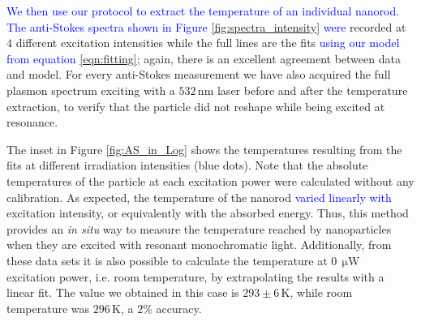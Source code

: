 \documentclass[journal=nalefd,manuscript=letter]{achemso}
\newcommand{\HI}[1]{\textcolor{blue}{#1}} %
\newcommand{\K}{\ensuremath{\,\textrm{K}}}
\newcommand{\nm}{\ensuremath{\,\textrm{nm}}}
\newcommand{\uW}{\ensuremath{\,\upmu\textrm{W}}}
\begin{document}
\HI{We then use our protocol to extract the temperature of an individual nanorod. 
The anti-Stokes spectra shown in Figure \ref{fig:spectra_intensity} were}
recorded at $4$ different excitation intensities while the full lines are the
fits \HI{using our model from equation \ref{eqn:fitting}}; 
again, there is an excellent agreement between data and model. For every
anti-Stokes measurement we have also acquired the full plasmon spectrum 
exciting with a $532\nm$ laser before and after the temperature extraction,
to verify that the particle did not reshape while being excited at resonance. 

The inset in Figure \ref{fig:AS_in_Log} shows the temperatures resulting from
the fits at different irradiation intensities (blue dots). Note
that the absolute temperatures of the particle at each excitation power were
calculated without any calibration. As expected, the temperature of the nanorod
\HI{varied linearly with} excitation intensity, or equivalently with the absorbed
energy. Thus, this method provides an \textit{in situ} way to measure the
temperature reached by nanoparticles when they are excited with resonant
monochromatic light. Additionally, from these data sets it  is also possible to
calculate the temperature at $0\uW$ excitation power, i.e. room temperature, by
extrapolating the results with a linear fit. The value we obtained in this case
is $293\pm 6 \K$, while room temperature was $296\K$, a $2\%$ accuracy.
\end{document}
